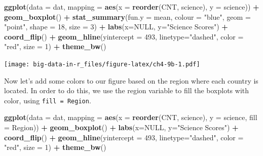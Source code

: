 \documentclass[]{book}
\newenvironment{Shaded}{\begin{snugshade}}{\end{snugshade}}
\newcommand{\DataTypeTok}[1]{\textcolor[rgb]{0.13,0.29,0.53}{#1}}
\newcommand{\DecValTok}[1]{\textcolor[rgb]{0.00,0.00,0.81}{#1}}
\newcommand{\KeywordTok}[1]{\textcolor[rgb]{0.13,0.29,0.53}{\textbf{#1}}}
\newcommand{\NormalTok}[1]{#1}
\newcommand{\OperatorTok}[1]{\textcolor[rgb]{0.81,0.36,0.00}{\textbf{#1}}}
\newcommand{\OtherTok}[1]{\textcolor[rgb]{0.56,0.35,0.01}{#1}}
\newcommand{\StringTok}[1]{\textcolor[rgb]{0.31,0.60,0.02}{#1}}
\begin{document}
\begin{Shaded}
\begin{Highlighting}[]
\KeywordTok{ggplot}\NormalTok{(}\DataTypeTok{data =}\NormalTok{ dat,}
       \DataTypeTok{mapping =} \KeywordTok{aes}\NormalTok{(}\DataTypeTok{x =} \KeywordTok{reorder}\NormalTok{(CNT, science), }\DataTypeTok{y =}\NormalTok{ science)) }\OperatorTok{+}
\StringTok{  }\KeywordTok{geom_boxplot}\NormalTok{() }\OperatorTok{+}
\StringTok{  }\KeywordTok{stat_summary}\NormalTok{(}\DataTypeTok{fun.y =}\NormalTok{ mean, }\DataTypeTok{colour =} \StringTok{"blue"}\NormalTok{, }\DataTypeTok{geom =} \StringTok{"point"}\NormalTok{, }
               \DataTypeTok{shape =} \DecValTok{18}\NormalTok{, }\DataTypeTok{size =} \DecValTok{3}\NormalTok{) }\OperatorTok{+}
\StringTok{  }\KeywordTok{labs}\NormalTok{(}\DataTypeTok{x=}\OtherTok{NULL}\NormalTok{, }\DataTypeTok{y=}\StringTok{"Science Scores"}\NormalTok{) }\OperatorTok{+}
\StringTok{  }\KeywordTok{coord_flip}\NormalTok{() }\OperatorTok{+}
\StringTok{  }\KeywordTok{geom_hline}\NormalTok{(}\DataTypeTok{yintercept =} \DecValTok{493}\NormalTok{, }\DataTypeTok{linetype=}\StringTok{"dashed"}\NormalTok{, }\DataTypeTok{color =} \StringTok{"red"}\NormalTok{, }\DataTypeTok{size =} \DecValTok{1}\NormalTok{) }\OperatorTok{+}
\StringTok{  }\KeywordTok{theme_bw}\NormalTok{()}
\end{Highlighting}
\end{Shaded}

\texttt{[image: big-data-in-r\_files/figure-latex/ch4-9b-1.pdf]}

Now let's add some colors to our figure based on the region where each country is located. In order to do this, we use the region variable to fill the boxplots with color, using \texttt{fill\ =\ Region}.

\begin{Shaded}
\begin{Highlighting}[]
\KeywordTok{ggplot}\NormalTok{(}\DataTypeTok{data =}\NormalTok{ dat,}
       \DataTypeTok{mapping =} \KeywordTok{aes}\NormalTok{(}\DataTypeTok{x =} \KeywordTok{reorder}\NormalTok{(CNT, science), }\DataTypeTok{y =}\NormalTok{ science, }\DataTypeTok{fill =}\NormalTok{ Region)) }\OperatorTok{+}
\StringTok{  }\KeywordTok{geom_boxplot}\NormalTok{() }\OperatorTok{+}
\StringTok{  }\KeywordTok{labs}\NormalTok{(}\DataTypeTok{x=}\OtherTok{NULL}\NormalTok{, }\DataTypeTok{y=}\StringTok{"Science Scores"}\NormalTok{) }\OperatorTok{+}
\StringTok{  }\KeywordTok{coord_flip}\NormalTok{() }\OperatorTok{+}
\StringTok{  }\KeywordTok{geom_hline}\NormalTok{(}\DataTypeTok{yintercept =} \DecValTok{493}\NormalTok{, }\DataTypeTok{linetype=}\StringTok{"dashed"}\NormalTok{, }\DataTypeTok{color =} \StringTok{"red"}\NormalTok{, }\DataTypeTok{size =} \DecValTok{1}\NormalTok{) }\OperatorTok{+}
\StringTok{  }\KeywordTok{theme_bw}\NormalTok{()}
\end{Highlighting}
\end{Shaded}
\end{document}
